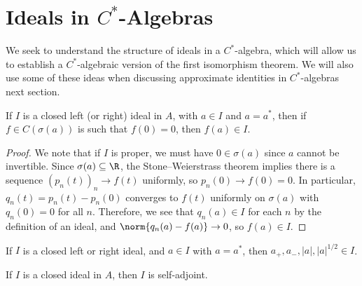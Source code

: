 \documentclass[10pt]{mypackage}
\begin{document}
\section{Ideals in $C^{\ast}$-Algebras}%
We seek to understand the structure of ideals in a $C^{\ast}$-algebra, which will allow us to establish a $C^{\ast}$-algebraic version of the first isomorphism theorem. We will also use some of these ideas when discussing approximate identities in $C^{\ast}$-algebras next section.
\begin{proposition}
  If $I$ is a closed left (or right) ideal in $A$, with $a\in I$ and $a = a^{\ast}$, then if $f\in C(\sigma(a))$ is such that $f(0) = 0$, then $f(a)\in I$.
\end{proposition}
\begin{proof}
  We note that if $I$ is proper, we must have $0\in \sigma(a)$ since $a$ cannot be invertible. Since $\sigma(a)\subseteq \R$, the Stone--Weierstrass theorem implies there is a sequence $\left( p_n(t) \right)_n\rightarrow f(t)$ uniformly, so $p_n(0) \rightarrow f(0) = 0$. In particular, $q_n(t) = p_n(t) - p_n(0)$ converges to $f(t)$ uniformly on $\sigma(a)$ with $q_n(0) = 0$ for all $n$. Therefore, we see that $q_n(a) \in I$ for each $n$ by the definition of an ideal, and $\norm{q_n(a) - f(a)} \rightarrow 0$, so $f(a)\in I$.
\end{proof}
\begin{corollary}
  If $I$ is a closed left or right ideal, and $a\in I$ with $a = a^{\ast}$, then $a_{+},a_{-},\left\vert a \right\vert,\left\vert a \right\vert^{1/2}\in I$.
\end{corollary}
\begin{theorem}
  If $I$ is a closed ideal in $A$, then $I$ is self-adjoint.
\end{theorem}
\end{document}
